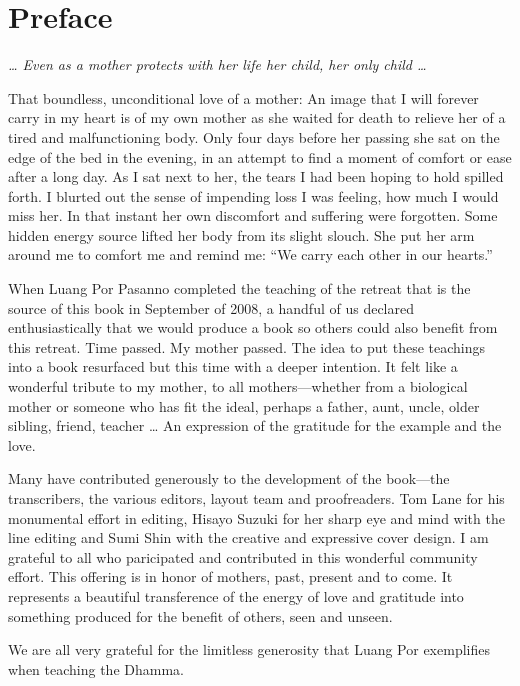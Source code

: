 \chapter{Preface}

{\center
\emph{\ldots{} Even as a mother protects with her life her child, her only
child \ldots{}}

}

\vspace{1em}\noindent
That boundless, unconditional love of a mother: An image that I will
forever carry in my heart is of my own mother as she waited for death to
relieve her of a tired and malfunctioning body. Only four days before
her passing she sat on the edge of the bed in the evening, in an attempt
to find a moment of comfort or ease after a long day. As I sat next to
her, the tears I had been hoping to hold spilled forth. I blurted out
the sense of impending loss I was feeling, how much I would miss her. In
that instant her own discomfort and suffering were forgotten. Some
hidden energy source lifted her body from its slight slouch. She put her
arm around me to comfort me and remind me: “We carry each other in our
hearts.”

When Luang Por Pasanno completed the teaching of the retreat that is the
source of this book in September of 2008, a handful of us declared
enthusiastically that we would produce a book so others could also
benefit from this retreat. Time passed. My mother passed. The idea to
put these teachings into a book resurfaced but this time with a deeper
intention. It felt like a wonderful tribute to my mother, to all
mothers—whether from a biological mother or someone who has fit the
ideal, perhaps a father, aunt, uncle, older sibling, friend, teacher \ldots{}
An expression of the gratitude for the example and the love.

Many have contributed generously to the development of the book—the
transcribers, the various editors, layout team and proofreaders. Tom
Lane for his monumental effort in editing, Hisayo Suzuki for her sharp
eye and mind with the line editing and Sumi Shin with the creative and
expressive cover design. I am grateful to all who paricipated and
contributed in this wonderful community effort. This offering is in
honor of mothers, past, present and to come. It represents a beautiful
transference of the energy of love and gratitude into something produced
for the benefit of others, seen and unseen.

We are all very grateful for the limitless generosity that Luang Por
exemplifies when teaching the Dhamma.

